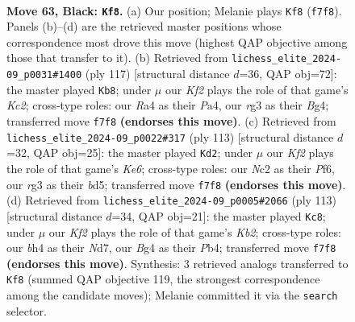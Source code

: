 \documentclass[11pt]{article}
\begin{document}
\clearpage

\begin{figure}[p]\centering
\begin{subfigure}{0.46\textwidth}\centering
\resizebox{\linewidth}{!}{%
\newchessgame
\chessboard[
  setfen={8/1R3k2/7r/8/r5bB/6R1/2n2P2/7K b - - 6 63},
  showmover=false,
  pgfstyle=straightmove, color=movearrow, markmove={f7-f8}
]}
\caption{}
\end{subfigure}\hfill
\begin{subfigure}{0.46\textwidth}\centering
\resizebox{\linewidth}{!}{%
\newchessgame
\chessboard[
  setfen={8/2k2R2/8/2K4p/p1B3bP/6P1/2r5/8 b - - 2 59},
  showmover=false,
  pgfstyle=straightmove, color=movearrow, markmove={c7-b8}
]}
\caption{}
\end{subfigure}
\\[4pt]
\begin{subfigure}{0.46\textwidth}\centering
\resizebox{\linewidth}{!}{%
\newchessgame
\chessboard[
  setfen={8/b7/P4p2/1K1B1P1r/4R3/4k3/8/8 b - - 0 57},
  showmover=false,
  pgfstyle=straightmove, color=movearrow, markmove={e3-d2}
]}
\caption{}
\end{subfigure}\hfill
\begin{subfigure}{0.46\textwidth}\centering
\resizebox{\linewidth}{!}{%
\newchessgame
\chessboard[
  setfen={8/1k1n1R2/6R1/3r4/1p4p1/8/7P/2K5 b - - 10 57},
  showmover=false,
  pgfstyle=straightmove, color=movearrow, markmove={b7-c8}
]}
\caption{}
\end{subfigure}
\caption{\textbf{Move 63, Black: \texttt{Kf8}.} (a) Our position; Melanie plays \texttt{Kf8} (\texttt{f7f8}). Panels (b)--(d) are the retrieved master positions whose correspondence most drove this move (highest QAP objective among those that transfer to it). (b) Retrieved from \texttt{lichess\_elite\_2024-09\_p0031\#1400} (ply 117) [structural distance $d$=36, QAP obj=72]: the master played \texttt{Kb8}; under $\mu$ our \emph{Kf2} plays the role of that game's \emph{Kc2}; cross-type roles: our \emph{R}a4 as their \emph{P}a4, our \emph{r}g3 as their \emph{B}g4; transferred move \texttt{f7f8} \textbf{(endorses this move)}. (c) Retrieved from \texttt{lichess\_elite\_2024-09\_p0022\#317} (ply 113) [structural distance $d$=32, QAP obj=25]: the master played \texttt{Kd2}; under $\mu$ our \emph{Kf2} plays the role of that game's \emph{Ke6}; cross-type roles: our \emph{N}c2 as their \emph{P}f6, our \emph{r}g3 as their \emph{b}d5; transferred move \texttt{f7f8} \textbf{(endorses this move)}. (d) Retrieved from \texttt{lichess\_elite\_2024-09\_p0005\#2066} (ply 113) [structural distance $d$=34, QAP obj=21]: the master played \texttt{Kc8}; under $\mu$ our \emph{Kf2} plays the role of that game's \emph{Kb2}; cross-type roles: our \emph{b}h4 as their \emph{N}d7, our \emph{B}g4 as their \emph{P}b4; transferred move \texttt{f7f8} \textbf{(endorses this move)}. Synthesis: 3 retrieved analogs transferred to \texttt{Kf8} (summed QAP objective 119, the strongest correspondence among the candidate moves); Melanie committed it via the \texttt{search} selector.}
\label{fig:thought-m125}
\end{figure}
\end{document}
